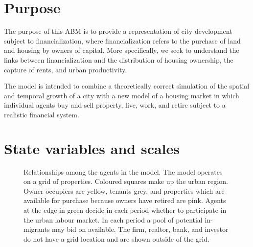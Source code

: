 \section{Purpose}
The purpose of this ABM is to provide a representation of city development subject to financialization, where financialization refers to the purchase of land and housing by owners of capital. More specifically, we seek to understand the links between financialization and the distribution of housing ownership, the capture of rents, and urban productivity. 

The model  is intended to combine a theoretically correct simulation of the spatial and temporal growth of a city with a new model of a housing market in which individual agents buy and sell property, live, work, and retire subject to a realistic financial system. 



\section{State variables and scales}

\begin{figure}[h!tb] 
    \centering
        \resizebox{.95\textwidth}{!}{}
     \caption[Relationships among the agents in the model]{Relationships among the agents in the model. The model operates on a grid of properties. Coloured squares make up the urban region. Owner-occupiers are yellow, tenants grey, and properties which are available for purchase because owners have retired are pink.  Agents at the edge in green decide in each period whether to participate in the urban labour market. In each period a pool of potential in-migrants may bid on available. The firm, realtor, bank, and investor do not have a grid location and are shown outside of the grid.}
\label{fig:Kirsten_overview_figure}
\end{figure}

%         

